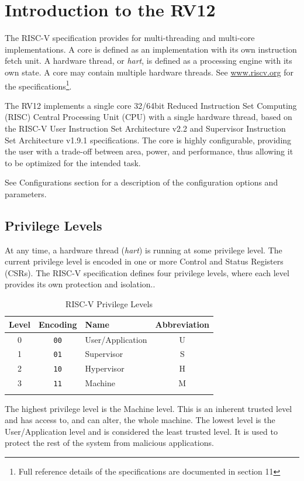 \chapter{Introduction to the RV12} \label{introduction-to-the-rv12}

The RISC-V specification provides for multi-threading and multi-core implementations. 
A core is defined as an implementation with its own instruction fetch unit. 
A hardware thread, or \emph{hart}, is defined as a processing engine with its own state. 
A core may contain multiple hardware threads. 
See \href{http://www.riscv.org}{www.riscv.org} for the specifications\footnote{Full reference details of the specifications are documented in section 11}.

The RV12 implements a single core 32/64bit Reduced Instruction Set Computing (RISC) Central Processing Unit (CPU) with a single hardware thread, based on the RISC-V User Instruction Set Architecture v2.2 and Supervisor Instruction Set Architecture v1.9.1 specifications. 
The core is highly configurable, providing the user with a trade-off between area, power, and performance, thus allowing it to be optimized for the intended task.

	See Configurations section for a description of the configuration options and parameters.

\section{Privilege Levels}\label{privilege-levels}

At any time, a hardware thread (\emph{hart}) is running at some privilege level. 
The current privilege level is encoded in one or more Control and Status Registers (CSRs). 
The RISC-V specification defines four privilege levels, where each level provides its own protection and isolation..

\begin{longtable}[]{@{}cclc@{}}
\toprule
	Level & Encoding    & Name             & Abbreviation\tabularnewline
\midrule
\endhead
	0     & \texttt{00} & User/Application & U\tabularnewline
	1     & \texttt{01} & Supervisor       & S\tabularnewline
	2     & \texttt{10} & Hypervisor       & H\tabularnewline
	3     & \texttt{11} & Machine          & M\tabularnewline
\bottomrule
\caption{RISC-V Privilege Levels}
\label{tab:riscv-priv-levels}
\end{longtable}

The highest privilege level is the Machine level. 
This is an inherent trusted level and has access to, and can alter, the whole machine. 
The lowest level is the User/Application level and is considered the least trusted level. 
It is used to protect the rest of the system from malicious applications.

